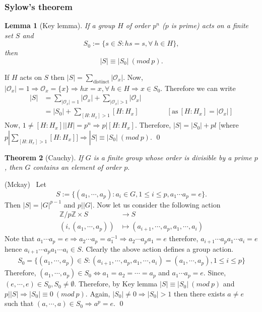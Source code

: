 \documentclass[11pt]{amsart}
\newtheorem{theorem}{Theorem}[section]
\newtheorem{lemma}[theorem]{Lemma}%
\newcommand{\ZZ}{\mathbb Z}
\begin{document}
\subsubsection{Sylow's theorem}

\begin{lemma}[Key lemma]
If a group $H$ of order $p^n$ ($p$ is prime) acts on a finite set  $S$ and $$ S_0:=\{s\in S:hs=s,\forall~h\in H\},$$ then $$|S|\equiv |S_0|~(mod~p).$$
\end{lemma}
\proof If $H$ acts on $S$ then $|S|=\displaystyle\sum_{\text{distinct}} |\mathcal{O}_x|.$ Now, $|\mathcal{O}_x|=1 \Rightarrow \mathcal{O}_x=\{x\} \Rightarrow hx=x,\forall~h\in H \Rightarrow x\in S_0.$ Therefore we can write \begin{align*}
|S|&=\displaystyle\sum_{|\mathcal{O}_x|=1} |\mathcal{O}_x|+\displaystyle\sum_{|\mathcal{O}_x|>1} |\mathcal{O}_x|\\
&=|S_0|+\displaystyle\sum_{[H:H_x]>1} [H:H_x]\qquad\qquad[\text{as}~[H:H_x]=|\mathcal{O}_x|]
\end{align*}
Now, $1\neq [H:H_x]\big| |H|=p^n \Rightarrow p\big| [H:H_x]$. Therefore, $|S|=|S_0|+pl$ [where $p|\displaystyle\sum_{[H:H_x]>1} [H:H_x]] \Rightarrow |S|\equiv |S_0|~(mod~p).$ \qed 
\begin{theorem}[Cauchy]
If $G$ is a finite group whose order is divisible by  a prime $p$, then $G$ contains an element of order $p.$
\end{theorem}
\proof (Mckay)~ Let $$S:=\{(a_1,\cdots,a_p):a_i\in G,1\leq i\leq p, a_1\cdots a_p=e\}.$$ Then $|S|=|G|^{p-1}$ and $p\big| |G|.$ Now let us consider the following action \begin{align*}
{\ZZ}/p{\ZZ}\times S&\to S\\
(i,(a_1,\cdots,a_p))&\mapsto (a_{i+1},\cdots,a_p,a_1,\cdots,a_i)
\end{align*}
Note that $a_1\cdots a_p=e \Rightarrow a_2\cdots a_p=a_1^{-1} \Rightarrow a_2\cdots a_pa_1=e$ therefore, $a_{i+1}\cdots a_pa_1\cdots a_i=e$ hence $a_{i+1}\cdots a_pa_1\cdots a_i\in S.$ Clearly the above action defines a group action. \begin{align*}
S_0=\{(a_1,\cdots,a_p)\in S:(a_{i+1},\cdots,a_p,a_1,\cdots,a_i)=(a_1,\cdots,a_p),1\leq i\leq p\}
\end{align*}
Therefore, $(a_1,\cdots,a_p)\in S_0 \Leftrightarrow a_1=a_2=\cdots=a_p$ and $a_1\cdots a_p=e$. Since, $(e,\cdots,e)\in S_0, S_0\neq \emptyset$. Therefore, by Key lemma $|S|\equiv|S_0|~(mod~p)$ and $p\big| |S| \Rightarrow |S_0|\equiv 0~(mod~p)$. Again, $|S_0|\neq 0 \Rightarrow |S_0|>1$ then there exists $a\neq e$ such that $(a,\cdots,a)\in S_0 \Rightarrow a^p=e.$ \qed
\end{document}
